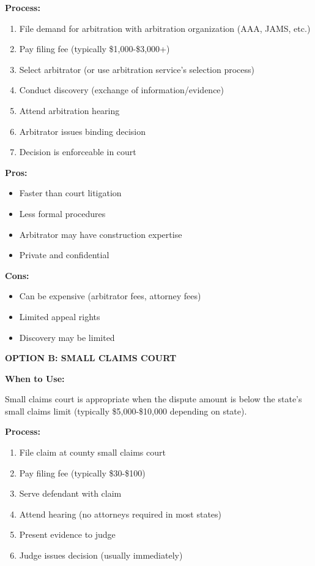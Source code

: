 \documentclass[11pt,letterpaper]{article}
\begin{document}
\vspace{6pt}

\textbf{Process:}

\begin{enumerate}
\item File demand for arbitration with arbitration organization (AAA, JAMS, etc.)
\item Pay filing fee (typically \$1,000-\$3,000+)
\item Select arbitrator (or use arbitration service's selection process)
\item Conduct discovery (exchange of information/evidence)
\item Attend arbitration hearing
\item Arbitrator issues binding decision
\item Decision is enforceable in court
\end{enumerate}

\vspace{6pt}

\textbf{Pros:}
\begin{itemize}[leftmargin=0.75in]
\item Faster than court litigation
\item Less formal procedures
\item Arbitrator may have construction expertise
\item Private and confidential
\end{itemize}

\textbf{Cons:}
\begin{itemize}[leftmargin=0.75in]
\item Can be expensive (arbitrator fees, attorney fees)
\item Limited appeal rights
\item Discovery may be limited
\end{itemize}

\vspace{6pt}

\textbf{OPTION B: SMALL CLAIMS COURT}

\textbf{When to Use:}

Small claims court is appropriate when the dispute amount is below the state's small claims limit (typically \$5,000-\$10,000 depending on state).

\vspace{6pt}

\textbf{Process:}

\begin{enumerate}
\item File claim at county small claims court
\item Pay filing fee (typically \$30-\$100)
\item Serve defendant with claim
\item Attend hearing (no attorneys required in most states)
\item Present evidence to judge
\item Judge issues decision (usually immediately)
\end{enumerate}
\end{document}
